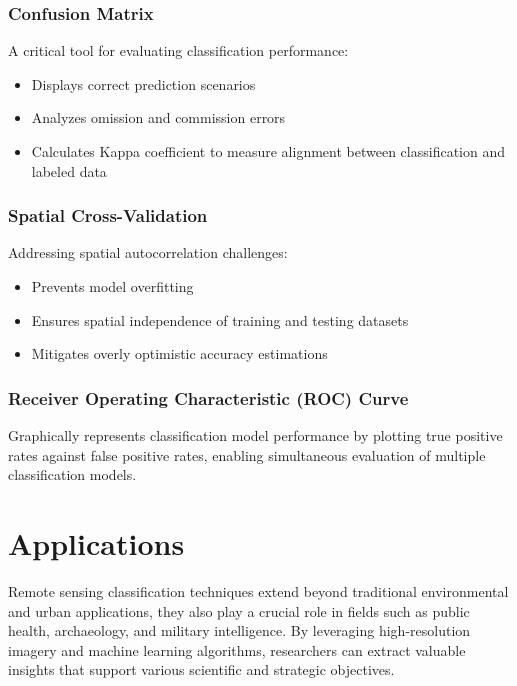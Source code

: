 \documentclass[
  letterpaper,
]{scrbook}
\begin{document}
\subsubsection{Confusion Matrix}\label{confusion-matrix}

A critical tool for evaluating classification performance:

\begin{itemize}
\item
  Displays correct prediction scenarios
\item
  Analyzes omission and commission errors
\item
  Calculates Kappa coefficient to measure alignment between
  classification and labeled data
\end{itemize}

\subsubsection{Spatial Cross-Validation}\label{spatial-cross-validation}

Addressing spatial autocorrelation challenges:

\begin{itemize}
\item
  Prevents model overfitting
\item
  Ensures spatial independence of training and testing datasets
\item
  Mitigates overly optimistic accuracy estimations
\end{itemize}

\subsubsection{Receiver Operating Characteristic (ROC)
Curve}\label{receiver-operating-characteristic-roc-curve}

Graphically represents classification model performance by plotting true
positive rates against false positive rates, enabling simultaneous
evaluation of multiple classification models.

\section{Applications}\label{applications-5}

Remote sensing classification techniques extend beyond traditional
environmental and urban applications, they also play a crucial role in
fields such as public health, archaeology, and military intelligence. By
leveraging high-resolution imagery and machine learning algorithms,
researchers can extract valuable insights that support various
scientific and strategic objectives.
\end{document}
